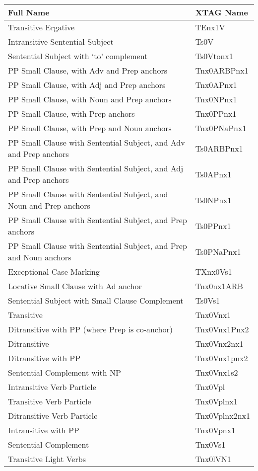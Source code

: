 \normalsize

\footnotesize
\begin{tabular}{ll}
Full Name&XTAG Name\\
\hline
Transitive Ergative  &  TEnx1V\\
Intransitive Sentential Subject &  Ts0V\\
Sentential Subject with `to' complement &  Ts0Vtonx1\\
PP Small Clause, with Adv and Prep anchors & Tnx0ARBPnx1\\
PP Small Clause, with Adj and Prep anchors & Tnx0APnx1\\
PP Small Clause, with Noun and Prep anchors & Tnx0NPnx1\\
PP Small Clause, with Prep anchors & Tnx0PPnx1\\
PP Small Clause, with Prep and Noun anchors & Tnx0PNaPnx1\\
PP Small Clause with Sentential Subject, and Adv and Prep anchors & Ts0ARBPnx1\\
PP Small Clause with Sentential Subject, and Adj and Prep anchors & Ts0APnx1\\
PP Small Clause with Sentential Subject, and Noun and Prep anchors & Ts0NPnx1\\
PP Small Clause with Sentential Subject, and Prep anchors & Ts0PPnx1\\
PP Small Clause with Sentential Subject, and Prep and Noun anchors & Ts0PNaPnx1\\
Exceptional Case Marking & TXnx0Vs1\\
Locative Small Clause with Ad anchor & Tnx0nx1ARB\\
Sentential Subject with Small Clause Complement & Ts0Vs1\\
Transitive & Tnx0Vnx1\\
Ditransitive with PP (where Prep is co-anchor) & Tnx0Vnx1Pnx2\\
Ditransitive & Tnx0Vnx2nx1\\
Ditransitive with PP & Tnx0Vnx1pnx2\\
Sentential Complement with NP & Tnx0Vnx1s2\\
Intransitive Verb Particle & Tnx0Vpl\\
Transitive Verb Particle & Tnx0Vplnx1\\
Ditransitive Verb Particle & Tnx0Vplnx2nx1\\
Intransitive with PP & Tnx0Vpnx1\\
Sentential Complement & Tnx0Vs1\\
Transitive Light Verbs & Tnx0lVN1\\

\end{tabular}
